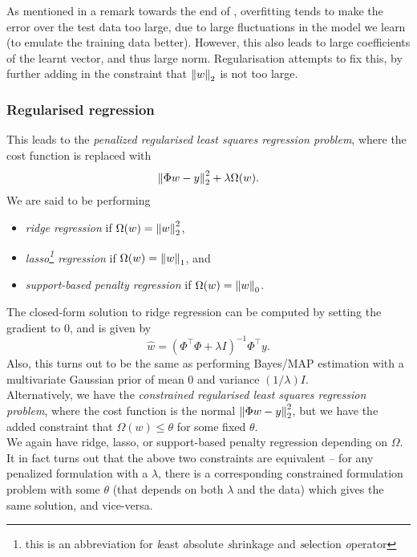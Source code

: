 \documentclass{article}
\begin{document}
		As mentioned in a remark towards the end of , overfitting tends to make the error over the test data too large, due to large fluctuations in the model we learn (to emulate the training data better). However, this also leads to large coefficients of the learnt vector, and thus large norm. Regularisation attempts to fix this, by further adding in the constraint that $\left\lVert w\right\rVert_2$ is not too large.

		\subsubsection{Regularised regression}

			This leads to the \emph{penalized regularised least squares regression problem}, where the cost function is replaced with
			\[ \left\lVert\Phi w - y\right\rVert_2^2 + \lambda\Omega(w). \]
			We are said to be performing
			\begin{itemize}
				\item \emph{ridge regression} if $\Omega(w) = \left\lVert w\right\rVert_2^2$,
				\item \emph{lasso\footnote{this is an abbreviation for \emph{l}east \emph{a}bsolute \emph{s}hrinkage and \emph{s}election \emph{o}perator} regression} if $\Omega(w) = \left\lVert w\right\rVert_1$, and
				\item \emph{support-based penalty regression} if $\Omega(w) = \left\lVert w\right\rVert_0$.
			\end{itemize}
			The closed-form solution to ridge regression can be computed by setting the gradient to $0$, and is given by
			\[ \hat{w} = (\Phi^\top\Phi + \lambda I)^{-1} \Phi^\top y. \]
			Also, this turns out to be the same as performing Bayes/MAP estimation with a multivariate Gaussian prior of mean $0$ and variance $(1/\lambda)I$.\\

			Alternatively, we have the \emph{constrained regularised least squares regression problem}, where the cost function is the normal $\left\lVert\Phi w - y\right\rVert_2^2$, but we have the added constraint that $\Omega(w) \le \theta$ for some fixed $\theta$.\\
			We again have ridge, lasso, or support-based penalty regression depending on $\Omega$.\\
			It in fact turns out that the above two constraints are equivalent -- for any penalized formulation with a $\lambda$, there is a corresponding constrained formulation problem with some $\theta$ (that depends on both $\lambda$ and the data) which gives the same solution, and vice-versa.\\
\end{document}
